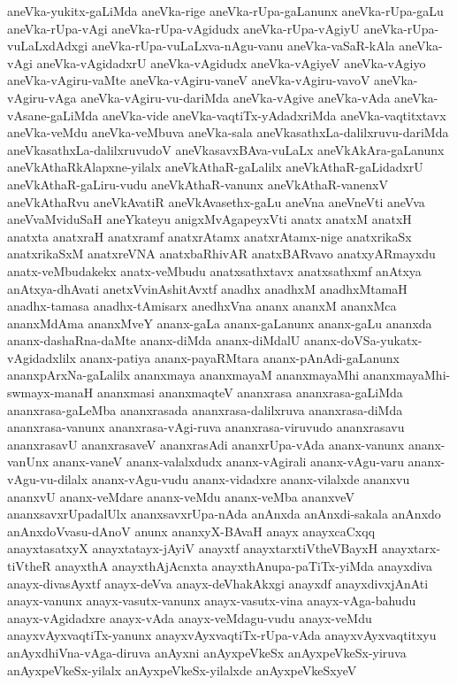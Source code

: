 {aneVka-yukitx-gaLiMda
aneVka-rige
aneVka-rUpa-gaLanunx
aneVka-rUpa-gaLu
aneVka-rUpa-vAgi
aneVka-rUpa-vAgidudx
aneVka-rUpa-vAgiyU
aneVka-rUpa-vuLaLxdAdxgi
aneVka-rUpa-vuLaLxva-nAgu-vanu
aneVka-vaSaR-kAla
aneVka-vAgi
aneVka-vAgidadxrU
aneVka-vAgidudx
aneVka-vAgiyeV
aneVka-vAgiyo
aneVka-vAgiru-vaMte
aneVka-vAgiru-vaneV
aneVka-vAgiru-vavoV
aneVka-vAgiru-vAga
aneVka-vAgiru-vu-dariMda
aneVka-vAgive
aneVka-vAda
aneVka-vAsane-gaLiMda
aneVka-vide
aneVka-vaqtiTx-yAdadxriMda
aneVka-vaqtitxtavx
aneVka-veMdu
aneVka-veMbuva
aneVka-sala
aneVkasathxLa-dalilxruvu-dariMda
aneVkasathxLa-dalilxruvudoV
aneVkasavxBAva-vuLaLx
aneVkAkAra-gaLanunx
aneVkAthaRkAlapxne-yilalx
aneVkAthaR-gaLalilx
aneVkAthaR-gaLidadxrU
aneVkAthaR-gaLiru-vudu
aneVkAthaR-vanunx
aneVkAthaR-vanenxV
aneVkAthaRvu
aneVkAvatiR
aneVkAvasethx-gaLu
aneVna
aneVneVti
aneVva
aneVvaMviduSaH
aneYkateyu
anigxMvAgapeyxVti
anatx
anatxM
anatxH
anatxta
anatxraH
anatxramf
anatxrAtamx
anatxrAtamx-nige
anatxrikaSx
anatxrikaSxM
anatxreVNA
anatxbaRhivAR
anatxBARvavo
anatxyARmayxdu
anatx-veMbudakekx
anatx-veMbudu
anatxsathxtavx
anatxsathxmf
anAtxya
anAtxya-dhAvati
anetxVvinAshitAvxtf
anadhx
anadhxM
anadhxMtamaH
anadhx-tamasa
anadhx-tAmisarx
anedhxVna
ananx
ananxM
ananxMca
ananxMdAma
ananxMveY
ananx-gaLa
ananx-gaLanunx
ananx-gaLu
ananxda
ananx-dashaRna-daMte
ananx-diMda
ananx-diMdalU
ananx-doVSa-yukatx-vAgidadxlilx
ananx-patiya
ananx-payaRMtara
ananx-pAnAdi-gaLanunx
ananxpArxNa-gaLalilx
ananxmaya
ananxmayaM
ananxmayaMhi
ananxmayaMhi-swmayx-manaH
ananxmasi
ananxmaqteV
ananxrasa
ananxrasa-gaLiMda
ananxrasa-gaLeMba
ananxrasada
ananxrasa-dalilxruva
ananxrasa-diMda
ananxrasa-vanunx
ananxrasa-vAgi-ruva
ananxrasa-viruvudo
ananxrasavu
ananxrasavU
ananxrasaveV
ananxrasAdi
ananxrUpa-vAda
ananx-vanunx
ananx-vanUnx
ananx-vaneV
ananx-valalxdudx
ananx-vAgirali
ananx-vAgu-varu
ananx-vAgu-vu-dilalx
ananx-vAgu-vudu
ananx-vidadxre
ananx-vilalxde
ananxvu
ananxvU
ananx-veMdare
ananx-veMdu
ananx-veMba
ananxveV
ananxsavxrUpadalUlx
ananxsavxrUpa-nAda
anAnxda
anAnxdi-sakala
anAnxdo
anAnxdoVvasu-dAnoV
anunx
ananxyX-BAvaH
anayx
anayxcaCxqq
anayxtasatxyX
anayxtatayx-jAyiV
anayxtf
anayxtarxtiVtheVBayxH
anayxtarx-tiVtheR
anayxthA
anayxthAjAcnxta
anayxthAnupa-paTiTx-yiMda
anayxdiva
anayx-divasAyxtf
anayx-deVva
anayx-deVhakAkxgi
anayxdf
anayxdivxjAnAti
anayx-vanunx
anayx-vasutx-vanunx
anayx-vasutx-vina
anayx-vAga-bahudu
anayx-vAgidadxre
anayx-vAda
anayx-veMdagu-vudu
anayx-veMdu
anayxvAyxvaqtiTx-yanunx
anayxvAyxvaqtiTx-rUpa-vAda
anayxvAyxvaqtitxyu
anAyxdhiVna-vAga-diruva
anAyxni
anAyxpeVkeSx
anAyxpeVkeSx-yiruva
anAyxpeVkeSx-yilalx
anAyxpeVkeSx-yilalxde
anAyxpeVkeSxyeV
}
